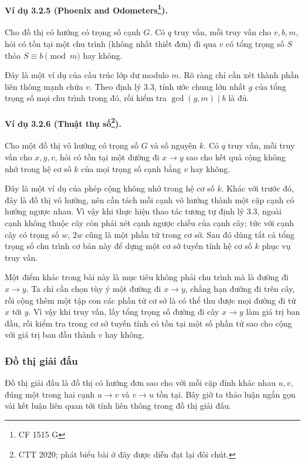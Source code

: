 \documentclass[11pt]{article}
\renewcommand{\leadsto}{\mathrel{\longrightarrow}}
\begin{document}
\paragraph{Ví dụ 3.2.5 (Phoenix and Odometers\protect\footnote{CF 1515 G}).}
Cho đồ thị có hướng có trọng số cạnh $G$. Có $q$ truy vấn, mỗi truy vấn cho
$v,b,m$, hỏi có tồn tại một chu trình (không nhất thiết đơn) đi qua $v$ có tổng
trọng số $S$ thỏa $S\equiv b\pmod m$ hay không.

Đây là một ví dụ của cấu trúc lớp dư modulo $m$. Rõ ràng chỉ cần xét thành phần
liên thông mạnh chứa $v$. Theo định lý 3.3, tính ước chung lớn nhất $g$ của tổng
trọng số mọi chu trình trong đó, rồi kiểm tra $\gcd(g,m)\mid b$ là đủ.

\paragraph{Ví dụ 3.2.6 (Thuật thụ số\protect\footnote{CTT 2020; phát biểu bài ở đây được diễn đạt lại đôi chút.}).}
Cho một đồ thị vô hướng có trọng số $G$ và số nguyên $k$. Có $q$ truy vấn, mỗi
truy vấn cho $x,y,v$, hỏi có tồn tại một đường đi $x\leadsto y$ sao cho kết quả
cộng không nhớ trong hệ cơ số $k$ của mọi trọng số cạnh bằng $v$ hay không.

Đây là một ví dụ của phép cộng không nhớ trong hệ cơ số $k$. Khác với trước đó,
đây là đồ thị vô hướng, nên cần tách mỗi cạnh vô hướng thành một cặp cạnh có
hướng ngược nhau. Vì vậy khi thực hiện thao tác tương tự định lý 3.3, ngoài cạnh
không thuộc cây còn phải xét cạnh ngược chiều của cạnh cây; tức với cạnh cây có
trọng số $w$, $2w$ cũng là một phần tử trong cơ sở. Sau đó dùng tất cả tổng trọng
số chu trình cơ bản này để dựng một cơ sở tuyến tính hệ cơ số $k$ phục vụ truy
vấn.

Một điểm khác trong bài này là mục tiêu không phải chu trình mà là đường đi
$x\leadsto y$. Ta chỉ cần chọn tùy ý một đường đi $x\leadsto y$, chẳng hạn
đường đi trên cây, rồi cộng thêm một tập con các phần tử cơ sở là có thể thu
được mọi đường đi từ $x$ tới $y$. Vì vậy khi truy vấn, lấy tổng trọng số đường
đi cây $x\leadsto y$ làm giá trị ban đầu, rồi kiểm tra trong cơ sở tuyến tính có
tồn tại một số phần tử sao cho cộng với giá trị ban đầu thành $v$ hay không.

\subsubsection{Đồ thị giải đấu}

Đồ thị giải đấu là đồ thị có hướng đơn sao cho với mỗi cặp đỉnh khác nhau
$u,v$, đúng một trong hai cạnh $u\to v$ và $v\to u$ tồn tại. Bây giờ ta thảo
luận ngắn gọn vài kết luận liên quan tới tính liên thông trong đồ thị giải đấu.
\end{document}
